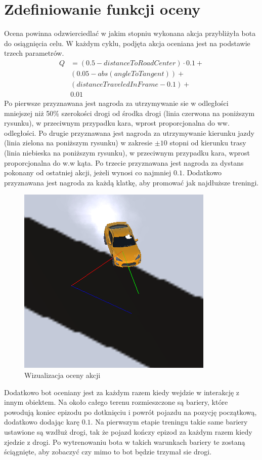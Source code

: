 \section{Zdefiniowanie funkcji oceny}
Ocena powinna odzwierciedlać w jakim stopniu wykonana akcja przybliżyła bota do osiągnięcia celu. W każdym cyklu, podjęta akcja oceniana jest na podstawie trzech parametrów.
\begin{align*}
    Q &= (0.5 - distanceToRoadCenter) \cdot 0.1 + \\
    & (0.05 - abs(angleToTangent)) + \\
    & (distanceTraveledInFrame - 0.1) + \\
    & 0.01
\end{align*}
Po pierwsze przyznawana jest nagroda za utrzymywanie sie w odległości mniejszej niż 50\% szerokości drogi od środka drogi (linia czerwona na poniższym rysunku), w przeciwnym przypadku kara, wprost proporcjonalna do ww. odległości. Po drugie przyznawana jest nagroda za utrzymywanie kierunku jazdy (linia zielona na poniższym rysunku) w zakresie $\pm10$ stopni od kierunku trasy (linia niebieska na poniższym rysunku), w przeciwnym przypadku kara, wprost proporcjonalna do w.w kąta. Po trzecie przyznawana jest nagroda za dystans pokonany od ostatniej akcji, jeżeli wynosi co najmniej $0.1$. Dodatkowo przyznawana jest nagroda za każdą klatkę, aby promować jak najdłuższe treningi.
\begin{figure}[H]
    \centering
    \includegraphics[width=.5\textwidth]{figures/rewards}
    \caption{Wizualizacja oceny akcji}
    \label{fig}
\end{figure}
Dodatkowo bot oceniany jest za każdym razem kiedy wejdzie w interakcję z innym obiektem. Na około całego terenu rozmieszczone są bariery, które powodują koniec epizodu po dotknięciu i powrót pojazdu na pozycję początkową, dodatkowo dodając karę $0.1$. Na pierwszym etapie treningu takie same bariery ustawione są wzdłuż drogi, tak że pojazd kończy epizod za każdym razem kiedy zjedzie z drogi. Po wytrenowaniu bota w takich warunkach bariery te zostaną ściągnięte, aby zobaczyć czy mimo to bot będzie trzymał sie drogi.\\
